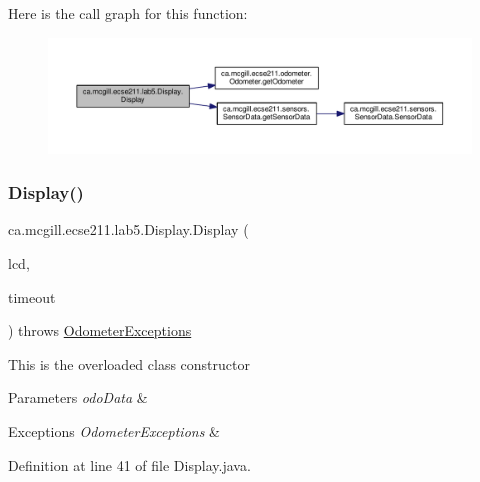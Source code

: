 Here is the call graph for this function\+:
\nopagebreak
\begin{figure}[H]
\begin{center}
\leavevmode
\includegraphics[width=350pt]{classca_1_1mcgill_1_1ecse211_1_1lab5_1_1_display_aeb15906f02c60c1ca449d4c37922739b_cgraph}
\end{center}
\end{figure}
\mbox{\label{classca_1_1mcgill_1_1ecse211_1_1lab5_1_1_display_abb1c01962b84cfad6ff897ce490b365a}} 
\subsubsection{\texorpdfstring{Display()}{Display()}\hspace{0.1cm}{\footnotesize\ttfamily [2/2]}}
{\footnotesize\ttfamily ca.\+mcgill.\+ecse211.\+lab5.\+Display.\+Display (\begin{DoxyParamCaption}\item[{Text\+L\+CD}]{lcd,  }\item[{long}]{timeout }\end{DoxyParamCaption}) throws \hyperlink{classca_1_1mcgill_1_1ecse211_1_1odometer_1_1_odometer_exceptions}{Odometer\+Exceptions}}

This is the overloaded class constructor


\begin{DoxyParams}{Parameters}
{\em odo\+Data} & \\
\hline
\end{DoxyParams}

\begin{DoxyExceptions}{Exceptions}
{\em Odometer\+Exceptions} & \\
\hline
\end{DoxyExceptions}


Definition at line 41 of file Display.\+java.

